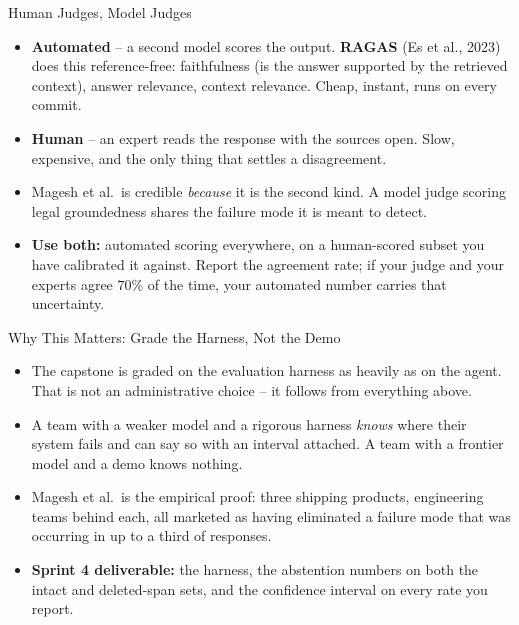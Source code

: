 \begin{frame}{Human Judges, Model Judges}
\begin{itemize}
  \item \textbf{Automated} -- a second model scores the output. \textbf{RAGAS} (Es et al., 2023) does this reference-free: faithfulness (is the answer supported by the retrieved context), answer relevance, context relevance. Cheap, instant, runs on every commit.
  \pause
  \item \textbf{Human} -- an expert reads the response with the sources open. Slow, expensive, and the only thing that settles a disagreement.
  \pause
  \item Magesh et al.\ is credible \emph{because} it is the second kind. A model judge scoring legal groundedness shares the failure mode it is meant to detect.
  \pause
  \item \textbf{Use both:} automated scoring everywhere, on a human-scored subset you have calibrated it against. Report the agreement rate; if your judge and your experts agree $70\%$ of the time, your automated number carries that uncertainty.
\end{itemize}
\end{frame}

\begin{frame}{Why This Matters: Grade the Harness, Not the Demo}
\begin{itemize}
  \item The capstone is graded on the evaluation harness as heavily as on the agent. That is not an administrative choice -- it follows from everything above.
  \pause
  \item A team with a weaker model and a rigorous harness \emph{knows} where their system fails and can say so with an interval attached. A team with a frontier model and a demo knows nothing.
  \pause
  \item Magesh et al.\ is the empirical proof: three shipping products, engineering teams behind each, all marketed as having eliminated a failure mode that was occurring in up to a third of responses.
  \pause
  \item \textbf{Sprint 4 deliverable:} the harness, the abstention numbers on both the intact and deleted-span sets, and the confidence interval on every rate you report.
\end{itemize}
\end{frame}
